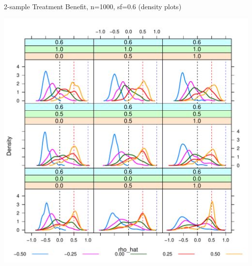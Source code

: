 \begin{frame}{2-sample Treatment Benefit, n=1000, sf=0.6 (density plots)}

\begin{center}
  \includegraphics[scale=0.45]{Figure3/tbl3DensityPlots_rho_n1000_003.pdf} %
\end{center}

\end{frame}


